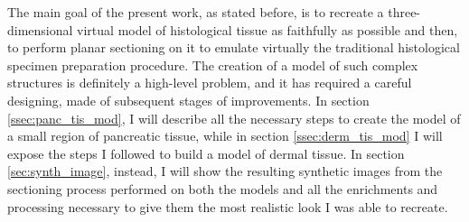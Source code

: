 The main goal of the present work, as stated before, is to recreate a three-dimensional virtual model of histological tissue as faithfully as possible and then, to perform planar sectioning on it to emulate virtually the traditional histological specimen preparation procedure. The creation of a model of such complex structures is definitely a high-level problem, and it has required a careful designing, made of subsequent stages of improvements.
In section \ref{ssec:panc_tis_mod}, I will describe all the necessary steps to create the model of a small region of pancreatic tissue, while in section \ref{ssec:derm_tis_mod} I will expose the steps I followed to build a model of dermal tissue. In section \ref{sec:synth_image}, instead, I will show the resulting synthetic images from the sectioning process performed on both the models and all the enrichments and processing necessary to give them the most realistic look I was able to recreate.
